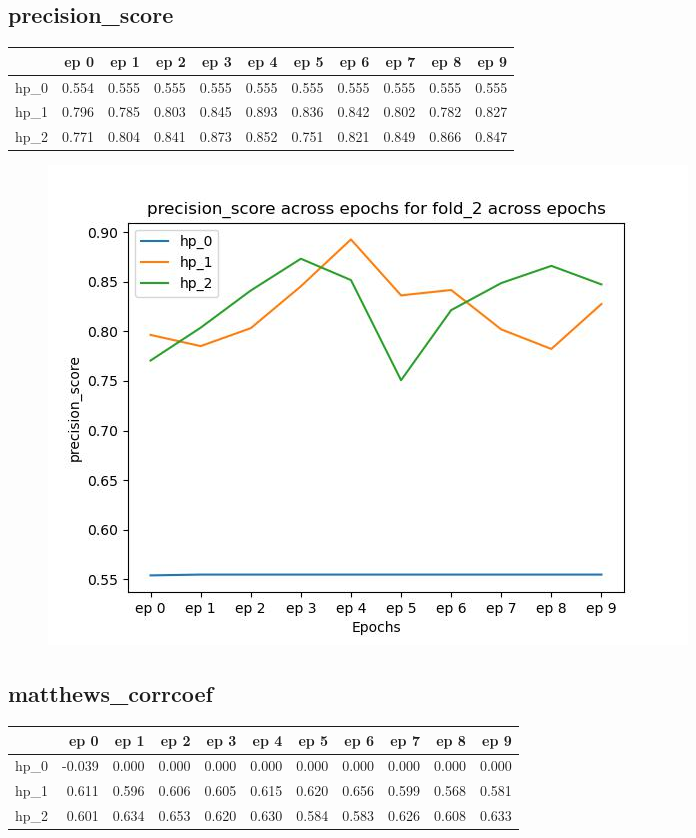 \documentclass{article}
\begin{document}
\subsection{precision\_score}
\begin{tabular}{lrrrrrrrrrr}
\toprule
{} &   ep 0 &   ep 1 &   ep 2 &   ep 3 &   ep 4 &   ep 5 &   ep 6 &   ep 7 &   ep 8 &   ep 9 \\
\midrule
hp\_0 &  0.554 &  0.555 &  0.555 &  0.555 &  0.555 &  0.555 &  0.555 &  0.555 &  0.555 &  0.555 \\
hp\_1 &  0.796 &  0.785 &  0.803 &  0.845 &  0.893 &  0.836 &  0.842 &  0.802 &  0.782 &  0.827 \\
hp\_2 &  0.771 &  0.804 &  0.841 &  0.873 &  0.852 &  0.751 &  0.821 &  0.849 &  0.866 &  0.847 \\
\bottomrule
\end{tabular}

\begin{figure}[H]
\includegraphics[scale = 0.75]{fold_2/precision_score}
\end{figure}
\subsection{matthews\_corrcoef}
\begin{tabular}{lrrrrrrrrrr}
\toprule
{} &   ep 0 &   ep 1 &   ep 2 &   ep 3 &   ep 4 &   ep 5 &   ep 6 &   ep 7 &   ep 8 &   ep 9 \\
\midrule
hp\_0 & -0.039 &  0.000 &  0.000 &  0.000 &  0.000 &  0.000 &  0.000 &  0.000 &  0.000 &  0.000 \\
hp\_1 &  0.611 &  0.596 &  0.606 &  0.605 &  0.615 &  0.620 &  0.656 &  0.599 &  0.568 &  0.581 \\
hp\_2 &  0.601 &  0.634 &  0.653 &  0.620 &  0.630 &  0.584 &  0.583 &  0.626 &  0.608 &  0.633 \\
\bottomrule
\end{tabular}
\end{document}
